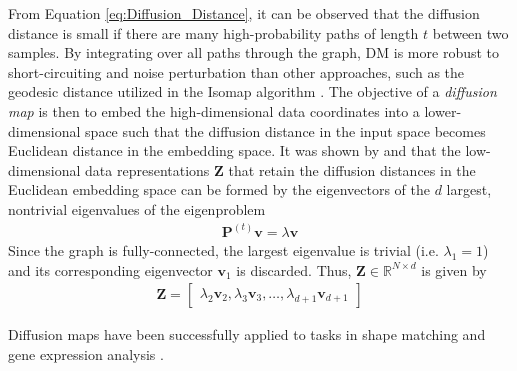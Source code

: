 From Equation \ref{eq:Diffusion_Distance}, it can be observed that the diffusion distance is small if there are many high-probability paths of length $t$ between two samples.  By integrating over all paths through the graph, DM is more robust to short-circuiting and noise perturbation than other approaches, such as the geodesic distance utilized in the  Isomap algorithm \citep{VanDerMaaten2009DRReview, Delaporte2008DiffusionMaps, Tenenbaum2000Isomap}.  The objective of a \textit{diffusion map} is then to embed the high-dimensional data coordinates into a lower-dimensional space such that the diffusion distance in the input space becomes Euclidean distance in the embedding space.  It was shown by \cite{Coifman2006DiffusionMaps} and \cite{Delaporte2008DiffusionMaps} that the low-dimensional data representations $\bm{Z}$ that retain the diffusion distances in the Euclidean embedding space can be formed by the eigenvectors of the $d$ largest, nontrivial eigenvalues of the eigenproblem 
\begin{align}
	\bm{P}^{(t)}\bm{v} = \lambda \bm{v}
\end{align}
\noindent
Since the graph is fully-connected, the largest eigenvalue is trivial (i.e. $\lambda_{1} = 1$) and its corresponding eigenvector $\bm{v}_{1}$ is discarded.  Thus, $\bm{Z} \in \mathbb{R}^{N \times d}$ is given by 
\begin{align}
	\bm{Z} = \begin{bmatrix}
		\lambda_{2} \bm{v}_{2}, \lambda_{3} \bm{v}_{3}, \dots, \lambda_{d+1} \bm{v}_{d+1}
	\end{bmatrix}
\end{align}

Diffusion maps have been successfully applied to tasks in shape matching and gene expression analysis \citep{VanDerMaaten2009DRReview}.



